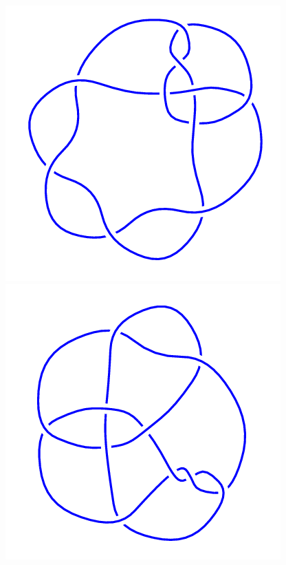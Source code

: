 \begin{figure}[H]
	\begin{minipage}[b]{.18\linewidth}
		\centering
		\includegraphics[width=\linewidth]{../data/10_82.png}
	\end{minipage}
	\begin{minipage}[b]{.18\linewidth}
		\centering
		\includegraphics[width=\linewidth]{../data/10_83.png}

\end{minipage}
\end{figure}
